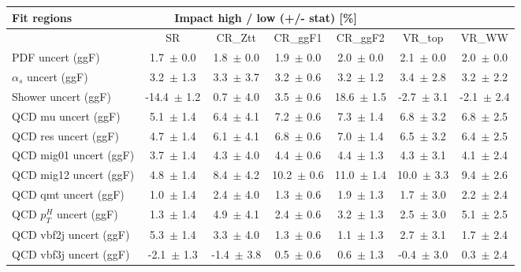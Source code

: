 \newcommand{\xmark}{\ding{55}}
\providecommand\rotatecell[2]{\rotatebox[origin=c]{#1}{#2}}
\begin{tabular}{ l || c  c  c  c  c  c }
Fit regions & \multicolumn{4}{||c}{Impact high / low (+/- stat) [\%]} &  & \tabularnewline
\hline
 & SR & CR\_Ztt & CR\_ggF1 & CR\_ggF2 & VR\_top & VR\_WW\tabularnewline
\hline
PDF uncert (ggF) & 1.7\, $\pm$  0.0 & 1.8\, $\pm$  0.0 & 1.9\, $\pm$  0.0 & 2.0\, $\pm$  0.0 & 2.1\, $\pm$  0.0 & 2.0\, $\pm$  0.0\tabularnewline
$\alpha_s$ uncert (ggF) & 3.2\, $\pm$  1.3 & 3.3\, $\pm$  3.7 & 3.2\, $\pm$  0.6 & 3.2\, $\pm$  1.2 & 3.4\, $\pm$  2.8 & 3.2\, $\pm$  2.2\tabularnewline
Shower uncert (ggF) & -14.4\, $\pm$  1.2 & 0.7\, $\pm$  4.0 & 3.5\, $\pm$  0.6 & 18.6\, $\pm$  1.5 & -2.7\, $\pm$  3.1 & -2.1\, $\pm$  2.4\tabularnewline
QCD mu uncert (ggF) & 5.1\, $\pm$  1.4 & 6.4\, $\pm$  4.1 & 7.2\, $\pm$  0.6 & 7.3\, $\pm$  1.4 & 6.8\, $\pm$  3.2 & 6.8\, $\pm$  2.5\tabularnewline
QCD res uncert (ggF) & 4.7\, $\pm$  1.4 & 6.1\, $\pm$  4.1 & 6.8\, $\pm$  0.6 & 7.0\, $\pm$  1.4 & 6.5\, $\pm$  3.2 & 6.4\, $\pm$  2.5\tabularnewline
QCD mig01 uncert (ggF) & 3.7\, $\pm$  1.4 & 4.3\, $\pm$  4.0 & 4.4\, $\pm$  0.6 & 4.4\, $\pm$  1.3 & 4.3\, $\pm$  3.1 & 4.1\, $\pm$  2.4\tabularnewline
QCD mig12 uncert (ggF) & 4.8\, $\pm$  1.4 & 8.4\, $\pm$  4.2 & 10.2\, $\pm$  0.6 & 11.0\, $\pm$  1.4 & 10.0\, $\pm$  3.3 & 9.4\, $\pm$  2.6\tabularnewline
QCD qmt uncert (ggF) & 1.0\, $\pm$  1.4 & 2.4\, $\pm$  4.0 & 1.3\, $\pm$  0.6 & 1.9\, $\pm$  1.3 & 1.7\, $\pm$  3.0 & 2.2\, $\pm$  2.4\tabularnewline
QCD $p_T^H$ uncert (ggF) & 1.3\, $\pm$  1.4 & 4.9\, $\pm$  4.1 & 2.4\, $\pm$  0.6 & 3.2\, $\pm$  1.3 & 2.5\, $\pm$  3.0 & 5.1\, $\pm$  2.5\tabularnewline
QCD vbf2j uncert (ggF) & 5.3\, $\pm$  1.4 & 3.3\, $\pm$  4.0 & 1.3\, $\pm$  0.6 & 1.1\, $\pm$  1.3 & 2.7\, $\pm$  3.1 & 1.7\, $\pm$  2.4\tabularnewline
QCD vbf3j uncert (ggF) & -2.1\, $\pm$  1.3 & -1.4\, $\pm$  3.8 & 0.5\, $\pm$  0.6 & 0.6\, $\pm$  1.3 & -0.4\, $\pm$  3.0 & 0.3\, $\pm$  2.4
\end{tabular}